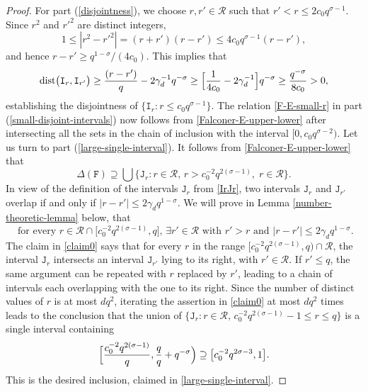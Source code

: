 \documentclass[a4paper,11pt]{amsart}
\numberwithin{equation}{section}
\begin{document}
\begin{proof} 
For part (\ref{disjointness}), we choose $r, r' \in \mathcal R$ such that $r' < r \leq 2c_0 q^{\sigma-1}$.  Since $r^2$ and $r'^2$ are distinct integers, 
\[ 1 \leq  | r^2 - r'^2| = ( r + r' )  ( r - r' ) \leq 4c_0 q^{\sigma-1} ( r - r'),   \]
and hence $r - r' \geq q^{1-\sigma}/(4c_0)$. This implies that 
\[ \text{dist}\bigl(\mathtt I_r, \mathtt I_{r'} \bigr)  \geq \frac{(r - r')}{q} - 2 \gamma_d^{-1} q^{-\sigma} \geq \Bigl[\frac{1}{4c_0} - 2 \gamma_d^{-1} \Bigr] q^{-\sigma} \geq \frac{q^{-\sigma}}{8c_0}> 0, \] 
establishing the disjointness of $\{\mathtt I_r: r \leq c_0 q^{\sigma-1}\}$. The relation \eqref{F-E-small-r} in part (\ref{small-disjoint-intervals}) now follows from \eqref{Falconer-E-upper-lower} after intersecting all the sets in the chain of inclusion with the interval $[0, c_0 q^{\sigma-2})$.
\vskip0.1in
\noindent Let us turn to part (\ref{large-single-interval}).  It follows from \eqref{Falconer-E-upper-lower} that
\begin{equation} 
\Delta(\mathtt F) \supseteq \bigcup \bigl\{\mathtt J_r : r \in \mathcal R, \, r > c_0^{-2}q^{2(\sigma-1)}, \; r \in \mathcal R \bigr\}.  \label{claim-1} \end{equation}  
In view of the definition of the intervals $\mathtt J_r$ from \eqref{IrJr}, two intervals $\mathtt J_{r}$ and $\mathtt J_{r'}$ overlap if and only if $|r - r'| \leq 2 \gamma_d q^{1 - \sigma}$.  
We will prove in Lemma \ref{number-theoretic-lemma} below, that 
\begin{equation}  \text{ for every $r \in \mathcal R \cap \bigl[c_0^{-2}q^{2(\sigma -1)}, q \bigr]$, $\exists r' \in \mathcal R$ with $r' > r$ and } |r - r'| \leq 2 \gamma_d q^{1 - \sigma}. \label{claim0} \end{equation} 
The claim in \eqref{claim0} says that for every $r$ in the range $[c_0^{-2}q^{2(\sigma-1)}, q)\cap \mathcal R$, the interval $\mathtt J_r$ intersects an interval $\mathtt J_{r'}$ lying to its right, with $r' \in \mathcal R$. If $r' \leq q$,  the same argument can be repeated with $r$ replaced by $r'$, leading to a chain of intervals each overlapping with the one to its right. Since the number of distinct values of $r$ is at most $dq^2$, iterating the assertion in \eqref{claim0} at most $dq^2$ times leads to the conclusion that the union of $\{\mathtt J_r : r \in \mathcal R, \, c_0^{-2} q^{2(\sigma-1)}-1 \leq r  \leq q \}$ is a single interval containing
\[ \Bigl[\frac{c_0^{-2}q^{2(\sigma-1)}}{q}, \frac{q}{q} + q^{-\sigma} \Bigr) \supseteq \bigl[c_0^{-2}q^{2\sigma-3},  1 \bigr].\] 
This is the desired inclusion, claimed in \eqref{large-single-interval}. 
\end{proof} 
\end{document}
